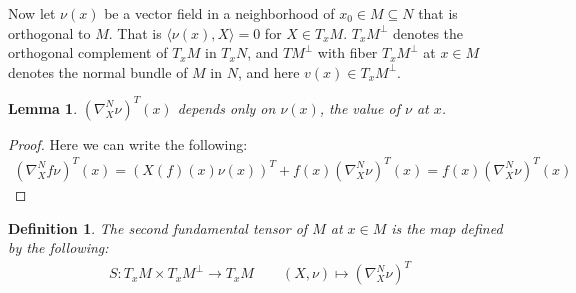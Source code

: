 \documentclass[11pt]{book}
\theoremstyle{break}
\theoremstyle{break}
\newtheorem{lem}{Lemma}[thm]
\newtheorem{defn}{Definition}[corL]
\begin{document}
Now let $\nu(x)$ be a vector field in a neighborhood of $x_0 \in M \subseteq N$ that is orthogonal to $M$. That is $\langle \nu(x), X\rangle = 0$ for $X \in T_xM$. $T_xM^\perp$ denotes the orthogonal complement of $T_xM$ in $T_xN$, and $TM^\perp$ with fiber $T_xM^{\perp}$ at $x \in M$ denotes the normal bundle of $M$ in $N$, and here $v(x) \in T_xM^\perp$. 

\begin{lem}
$(\nabla_X^N\nu)^T(x)$ depends only on $\nu(x)$, the value of $\nu$ at $x$.
\end{lem}
\begin{proof}
Here we can write the following:
\begin{align*}
\left( \nabla_X^Nf\nu\right)^T(x) = \left( X(f) (x) \nu(x) \right)^T+f(x) \left( \nabla_X^N \nu\right)^T(x) = f(x) \left(\nabla_X^N\nu\right)^T(x)
\end{align*}
\end{proof}

\begin{defn}
The second fundamental tensor of $M$ at $x \in M$ is the map defined by the following:
\begin{align*}
S:T_xM \times T_xM^{\perp} \to T_xM \qquad (X,\nu) \mapsto (\nabla_X^N\nu)^T
\end{align*}
\end{defn}
\end{document}
